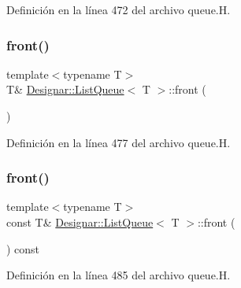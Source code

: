 Definición en la línea 472 del archivo queue.\+H.

\mbox{\label{class_designar_1_1_list_queue_aa7fc9ba1a7fb8e65819be9da7f96e106}} 
\subsubsection{\texorpdfstring{front()}{front()}\hspace{0.1cm}{\footnotesize\ttfamily [1/2]}}
{\footnotesize\ttfamily template$<$typename T$>$ \\
T\& \hyperlink{class_designar_1_1_list_queue}{Designar\+::\+List\+Queue}$<$ T $>$\+::front (\begin{DoxyParamCaption}{ }\end{DoxyParamCaption})\hspace{0.3cm}{\ttfamily [inline]}}



Definición en la línea 477 del archivo queue.\+H.

\mbox{\label{class_designar_1_1_list_queue_abfc6bf50f4b4158e735ccd2c2d49ab1b}} 
\subsubsection{\texorpdfstring{front()}{front()}\hspace{0.1cm}{\footnotesize\ttfamily [2/2]}}
{\footnotesize\ttfamily template$<$typename T$>$ \\
const T\& \hyperlink{class_designar_1_1_list_queue}{Designar\+::\+List\+Queue}$<$ T $>$\+::front (\begin{DoxyParamCaption}{ }\end{DoxyParamCaption}) const\hspace{0.3cm}{\ttfamily [inline]}}



Definición en la línea 485 del archivo queue.\+H.

\mbox{\label{class_designar_1_1_list_queue_a4b934d649cd814fff5ec643843b8245d}} 
